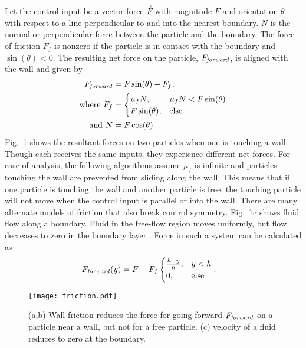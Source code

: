 Let the control input be a vector force $\vec{F}$ with magnitude $F$ and orientation $\theta$ with respect to a line perpendicular to and into the nearest boundary. $N$ is the normal or perpendicular force between the particle and the boundary. The force of friction $F_f$ is nonzero if the particle is in contact with the boundary and  $\sin(\theta) < 0$. The resulting net force on the particle, $F_{\text{\emph{forward}}}$, is aligned with the wall and given by
\begin{align}
F_{\text{\emph{forward}}} &=  F \sin(\theta) - F_f , \nonumber \\
\text{where }  F_f &= \begin{cases}  \mu_f N, &  \mu_f N < F \sin(\theta)  \label{eq:frictionmodel}  \\
F \sin(\theta), & \text{else} \end{cases} \\ %
\text{and } N &= F \cos(\theta) .\nonumber
\end{align}
 Fig.~\ref{fig:friction} shows the resultant forces on two particles when one is touching a wall. 
Though each receives the same inputs,  they experience different net forces.
  For ease of analysis, the following algorithms assume $\mu_f$ is infinite and particles touching the wall are prevented from sliding along the wall.
This means that if one particle is touching the wall and another particle is free, the touching particle will not move when the control input is parallel or into the wall. 
There are many alternate models of friction that also break control symmetry. Fig.~\ref{fig:friction}c shows fluid flow along a boundary.  Fluid in the free-flow region moves uniformly, but flow decreases to zero in the boundary layer \cite{fluidMechanics}.  Force in such a system can be calculated as
\begin{align}
F_{\text{\emph{forward}}}(y) &= F - F_f\begin{cases}  \frac{h-y}{h}   , &  y<h \label{eq:boundarylayerflow} \\
0, & \text{else} \end{cases}.
\end{align}

\begin{figure}[h]
\begin{center}
\texttt{[image: friction.pdf]} 
\vspace{-1em}
\caption{(a,b) Wall friction reduces the force for going forward $F_{\text{\emph{forward}}}$ on a particle near a wall, but not for a free particle. (c) velocity of a fluid reduces to zero at the boundary.
\label{fig:friction}
}\vspace{-1em}
\end{center}
\end{figure} 




